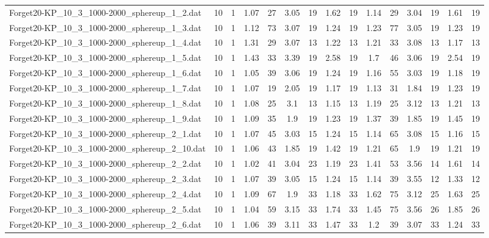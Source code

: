 \begin{table}[!ht]
{\begin{tabular}{lcccccccccccccc}
Forget20-KP\_10\_3\_1000-2000\_sphereup\_1\_2.dat & 10 & 1 & 1.07 & 27 & 3.05 & 19 & 1.62 & 19 & 1.14 & 29 & 3.04 & 19 & 1.61 & 19 \\
Forget20-KP\_10\_3\_1000-2000\_sphereup\_1\_3.dat & 10 & 1 & 1.12 & 73 & 3.07 & 19 & 1.24 & 19 & 1.23 & 77 & 3.05 & 19 & 1.23 & 19 \\
Forget20-KP\_10\_3\_1000-2000\_sphereup\_1\_4.dat & 10 & 1 & 1.31 & 29 & 3.07 & 13 & 1.22 & 13 & 1.21 & 33 & 3.08 & 13 & 1.17 & 13 \\
Forget20-KP\_10\_3\_1000-2000\_sphereup\_1\_5.dat & 10 & 1 & 1.43 & 33 & 3.39 & 19 & 2.58 & 19 & 1.7 & 46 & 3.06 & 19 & 2.54 & 19 \\
Forget20-KP\_10\_3\_1000-2000\_sphereup\_1\_6.dat & 10 & 1 & 1.05 & 39 & 3.06 & 19 & 1.24 & 19 & 1.16 & 55 & 3.03 & 19 & 1.18 & 19 \\
Forget20-KP\_10\_3\_1000-2000\_sphereup\_1\_7.dat & 10 & 1 & 1.07 & 19 & 2.05 & 19 & 1.17 & 19 & 1.13 & 31 & 1.84 & 19 & 1.23 & 19 \\
Forget20-KP\_10\_3\_1000-2000\_sphereup\_1\_8.dat & 10 & 1 & 1.08 & 25 & 3.1 & 13 & 1.15 & 13 & 1.19 & 25 & 3.12 & 13 & 1.21 & 13 \\
Forget20-KP\_10\_3\_1000-2000\_sphereup\_1\_9.dat & 10 & 1 & 1.09 & 35 & 1.9 & 19 & 1.23 & 19 & 1.37 & 39 & 1.85 & 19 & 1.45 & 19 \\
Forget20-KP\_10\_3\_1000-2000\_sphereup\_2\_1.dat & 10 & 1 & 1.07 & 45 & 3.03 & 15 & 1.24 & 15 & 1.14 & 65 & 3.08 & 15 & 1.16 & 15 \\
Forget20-KP\_10\_3\_1000-2000\_sphereup\_2\_10.dat & 10 & 1 & 1.06 & 43 & 1.85 & 19 & 1.42 & 19 & 1.21 & 65 & 1.9 & 19 & 1.21 & 19 \\
Forget20-KP\_10\_3\_1000-2000\_sphereup\_2\_2.dat & 10 & 1 & 1.02 & 41 & 3.04 & 23 & 1.19 & 23 & 1.41 & 53 & 3.56 & 14 & 1.61 & 14 \\
Forget20-KP\_10\_3\_1000-2000\_sphereup\_2\_3.dat & 10 & 1 & 1.07 & 39 & 3.05 & 15 & 1.24 & 15 & 1.14 & 39 & 3.55 & 12 & 1.33 & 12 \\
Forget20-KP\_10\_3\_1000-2000\_sphereup\_2\_4.dat & 10 & 1 & 1.09 & 67 & 1.9 & 33 & 1.18 & 33 & 1.62 & 75 & 3.12 & 25 & 1.63 & 25 \\
Forget20-KP\_10\_3\_1000-2000\_sphereup\_2\_5.dat & 10 & 1 & 1.04 & 59 & 3.15 & 33 & 1.74 & 33 & 1.45 & 75 & 3.56 & 26 & 1.85 & 26 \\
Forget20-KP\_10\_3\_1000-2000\_sphereup\_2\_6.dat & 10 & 1 & 1.06 & 39 & 3.11 & 33 & 1.47 & 33 & 1.2 & 39 & 3.07 & 33 & 1.24 & 33 \\

\end{tabular}}
\end{table}
